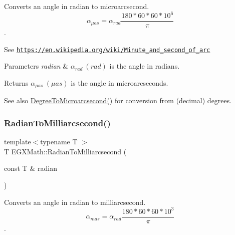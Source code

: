 Converts an angle in radian to microarcsecond. \[\alpha_{\mu as}=\alpha_{rad}\frac{180 * 60 * 60 * 10^6}{\pi}\]. 

See \href{https://en.wikipedia.org/wiki/Minute_and_second_of_arc}{\tt https\+://en.\+wikipedia.\+org/wiki/\+Minute\+\_\+and\+\_\+second\+\_\+of\+\_\+arc} 
\begin{DoxyParams}{Parameters}
{\em radian} & $\alpha_{rad}\ (rad)$ is the angle in radians. \\
\hline
\end{DoxyParams}
\begin{DoxyReturn}{Returns}
$\alpha_{\mu as}\ (\mu as)$ is the angle in microarcseconds. 
\end{DoxyReturn}
\begin{DoxySeeAlso}{See also}
\mbox{\hyperlink{group___e_g_x_math-_angle_conversions-_degree_ga31b65388fe1b4656663b3d66b9d764e6}{Degree\+To\+Microarcsecond()}} for conversion from (decimal) degrees. 
\end{DoxySeeAlso}
\mbox{\label{group___e_g_x_math-_angle_conversions-_radian_ga84fbb494a455cfeb30be62776f96c9a9}} 
\subsubsection{\texorpdfstring{Radian\+To\+Milliarcsecond()}{RadianToMilliarcsecond()}}
{\footnotesize\ttfamily template$<$typename T $>$ \\
T E\+G\+X\+Math\+::\+Radian\+To\+Milliarcsecond (\begin{DoxyParamCaption}\item[{const T \&}]{radian }\end{DoxyParamCaption})}



Converts an angle in radian to milliarcsecond. \[\alpha_{mas}=\alpha_{rad}\frac{180 * 60 * 60 * 10^3}{\pi}\]. 

